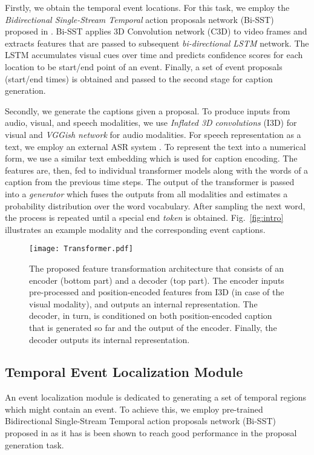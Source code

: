 \documentclass[10pt,twocolumn,letterpaper]{article}
\begin{document}
Firstly, we obtain the temporal event locations. For this task, we employ the \textit{Bidirectional Single-Stream Temporal} action proposals network (Bi-SST) proposed in \cite{Wang2018n}. Bi-SST applies 3D Convolution network (C3D) \cite{Tran2015} to video frames and extracts features that are passed to subsequent \textit{bi-directional LSTM} \cite{Hochreiter1997} network. The LSTM accumulates visual cues over time and predicts confidence scores for each location to be start/end point of an event. Finally, a set of event proposals (start/end times) is obtained and passed to the second stage for caption generation. 

Secondly, we generate the captions given a proposal. To produce inputs from audio, visual, and speech modalities, we use \textit{Inflated 3D convolutions} (I3D) \cite{Carreira2017} for visual and \textit{VGGish network} \cite{Hershey2017} for audio modalities. For speech representation as a text, we employ an external ASR system \cite{YouTube}. To represent the text into a numerical form, we use a similar text embedding which is used for caption encoding. The features are, then, fed to individual transformer models along with the words of a caption from the previous time steps. The output of the transformer is passed into a \textit{generator} which fuses the outputs from all modalities and estimates a probability distribution over the word vocabulary. After sampling the next word, the process is repeated until a special end \textit{token} is obtained. Fig.~\ref{fig:intro} illustrates an example modality and the corresponding event captions. 

\begin{figure*}[t!]
    \begin{center}
\texttt{[image: Transformer.pdf]}
    \end{center}
    \caption{The proposed feature transformation architecture that consists of an encoder (bottom part) and a decoder (top part). The encoder inputs pre-processed and position-encoded features from I3D (in case of the visual modality), and outputs an internal representation. The decoder, in turn, is conditioned on both position-encoded caption that is generated so far and the output of the encoder. Finally, the decoder outputs its internal representation.\label{fig:transformer}}
\end{figure*}

\subsection{Temporal Event Localization Module}
An event localization module is dedicated to generating a set of temporal regions which might contain an event. To achieve this, we employ pre-trained Bidirectional Single-Stream Temporal action proposals network (Bi-SST) proposed in \cite{Wang2018n} as it has is been shown to reach good performance in the proposal generation task.
\end{document}
